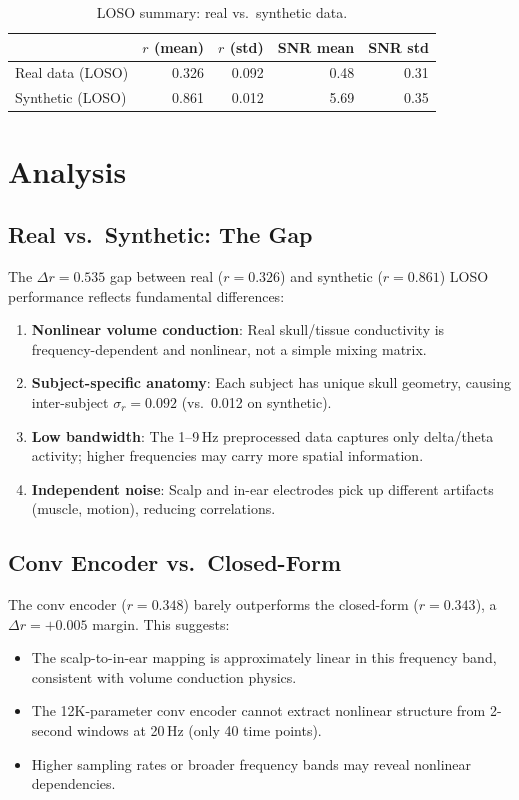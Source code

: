 \documentclass[11pt,a4paper]{article}
\begin{document}
\begin{table}[H]
\centering
\caption{LOSO summary: real vs.\ synthetic data.}
\begin{tabular}{lrrrr}
\toprule
& $r$ (mean) & $r$ (std) & SNR mean & SNR std \\
\midrule
Real data (LOSO) & 0.326 & 0.092 & 0.48 & 0.31 \\
Synthetic (LOSO) & 0.861 & 0.012 & 5.69 & 0.35 \\
\bottomrule
\end{tabular}
\end{table}

\section{Analysis}

\subsection{Real vs.\ Synthetic: The Gap}

The $\Delta r = 0.535$ gap between real ($r=0.326$) and synthetic ($r=0.861$)
LOSO performance reflects fundamental differences:

\begin{enumerate}
  \item \textbf{Nonlinear volume conduction}: Real skull/tissue conductivity is
    frequency-dependent and nonlinear, not a simple mixing matrix.
  \item \textbf{Subject-specific anatomy}: Each subject has unique skull geometry,
    causing inter-subject $\sigma_r = 0.092$ (vs.\ 0.012 on synthetic).
  \item \textbf{Low bandwidth}: The 1--9\,Hz preprocessed data captures only
    delta/theta activity; higher frequencies may carry more spatial information.
  \item \textbf{Independent noise}: Scalp and in-ear electrodes pick up
    different artifacts (muscle, motion), reducing correlations.
\end{enumerate}

\subsection{Conv Encoder vs.\ Closed-Form}

The conv encoder ($r=0.348$) barely outperforms the closed-form ($r=0.343$),
a $\Delta r = +0.005$ margin. This suggests:
\begin{itemize}
  \item The scalp-to-in-ear mapping is approximately linear in this frequency
    band, consistent with volume conduction physics.
  \item The 12K-parameter conv encoder cannot extract nonlinear structure
    from 2-second windows at 20\,Hz (only 40 time points).
  \item Higher sampling rates or broader frequency bands may reveal
    nonlinear dependencies.
\end{itemize}
\end{document}
